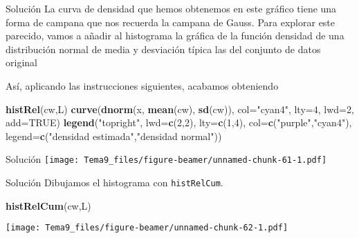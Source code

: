 \documentclass[
  ignorenonframetext,
]{beamer}
\newenvironment{Shaded}{\begin{snugshade}}{\end{snugshade}}
\newcommand{\DataTypeTok}[1]{\textcolor[rgb]{0.13,0.29,0.53}{#1}}
\newcommand{\DecValTok}[1]{\textcolor[rgb]{0.00,0.00,0.81}{#1}}
\newcommand{\KeywordTok}[1]{\textcolor[rgb]{0.13,0.29,0.53}{\textbf{#1}}}
\newcommand{\NormalTok}[1]{#1}
\newcommand{\OtherTok}[1]{\textcolor[rgb]{0.56,0.35,0.01}{#1}}
\newcommand{\StringTok}[1]{\textcolor[rgb]{0.31,0.60,0.02}{#1}}
\begin{document}
\begin{frame}[fragile]{Solución}
\protect\hypertarget{soluciuxf3n-45}{}
La curva de densidad que hemos obtenemos en este gráfico tiene una forma
de campana que nos recuerda la campana de Gauss. Para explorar este
parecido, vamos a añadir al histograma la gráfica de la función densidad
de una distribución normal de media y desviación típica las del conjunto
de datos original

Así, aplicando las instrucciones siguientes, acabamos obteniendo

\begin{Shaded}
\begin{Highlighting}[]
\KeywordTok{histRel}\NormalTok{(cw,L)}
\KeywordTok{curve}\NormalTok{(}\KeywordTok{dnorm}\NormalTok{(x, }\KeywordTok{mean}\NormalTok{(cw), }\KeywordTok{sd}\NormalTok{(cw)), }\DataTypeTok{col=}\StringTok{"cyan4"}\NormalTok{, }\DataTypeTok{lty=}\DecValTok{4}\NormalTok{, }\DataTypeTok{lwd=}\DecValTok{2}\NormalTok{,}
\DataTypeTok{add=}\OtherTok{TRUE}\NormalTok{)}
\KeywordTok{legend}\NormalTok{(}\StringTok{"topright"}\NormalTok{, }\DataTypeTok{lwd=}\KeywordTok{c}\NormalTok{(}\DecValTok{2}\NormalTok{,}\DecValTok{2}\NormalTok{), }\DataTypeTok{lty=}\KeywordTok{c}\NormalTok{(}\DecValTok{1}\NormalTok{,}\DecValTok{4}\NormalTok{), }\DataTypeTok{col=}\KeywordTok{c}\NormalTok{(}\StringTok{"purple"}\NormalTok{,}\StringTok{"cyan4"}\NormalTok{),}
       \DataTypeTok{legend=}\KeywordTok{c}\NormalTok{(}\StringTok{"densidad estimada"}\NormalTok{,}\StringTok{"densidad normal"}\NormalTok{))}
\end{Highlighting}
\end{Shaded}
\end{frame}

\begin{frame}{Solución}
\protect\hypertarget{soluciuxf3n-46}{}
\texttt{[image: Tema9\_files/figure-beamer/unnamed-chunk-61-1.pdf]}
\end{frame}

\begin{frame}[fragile]{Solución}
\protect\hypertarget{soluciuxf3n-47}{}
Dibujamos el histograma con \texttt{histRelCum}.

\begin{Shaded}
\begin{Highlighting}[]
\KeywordTok{histRelCum}\NormalTok{(cw,L)}
\end{Highlighting}
\end{Shaded}

\texttt{[image: Tema9\_files/figure-beamer/unnamed-chunk-62-1.pdf]}
\end{frame}
\end{document}
